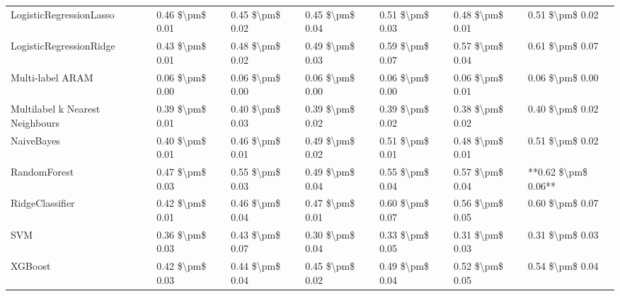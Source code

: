 \begin{tabular}{lllllll}
        LogisticRegressionLasso & 0.46 \$\textbackslash pm\$ 0.01 &           0.45 \$\textbackslash pm\$ 0.02 &       0.45 \$\textbackslash pm\$ 0.04 &        0.51 \$\textbackslash pm\$ 0.03 &                         0.48 \$\textbackslash pm\$ 0.01 &     0.51 \$\textbackslash pm\$ 0.02 \\
        LogisticRegressionRidge & 0.43 \$\textbackslash pm\$ 0.01 &           0.48 \$\textbackslash pm\$ 0.02 &       0.49 \$\textbackslash pm\$ 0.03 &        0.59 \$\textbackslash pm\$ 0.07 &                         0.57 \$\textbackslash pm\$ 0.04 &     0.61 \$\textbackslash pm\$ 0.07 \\
               Multi-label ARAM & 0.06 \$\textbackslash pm\$ 0.00 &           0.06 \$\textbackslash pm\$ 0.00 &       0.06 \$\textbackslash pm\$ 0.00 &        0.06 \$\textbackslash pm\$ 0.00 &                         0.06 \$\textbackslash pm\$ 0.01 &     0.06 \$\textbackslash pm\$ 0.00 \\
Multilabel k Nearest Neighbours & 0.39 \$\textbackslash pm\$ 0.01 &           0.40 \$\textbackslash pm\$ 0.03 &       0.39 \$\textbackslash pm\$ 0.02 &        0.39 \$\textbackslash pm\$ 0.02 &                         0.38 \$\textbackslash pm\$ 0.02 &     0.40 \$\textbackslash pm\$ 0.02 \\
                     NaiveBayes & 0.40 \$\textbackslash pm\$ 0.01 &           0.46 \$\textbackslash pm\$ 0.01 &       0.49 \$\textbackslash pm\$ 0.02 &        0.51 \$\textbackslash pm\$ 0.01 &                         0.48 \$\textbackslash pm\$ 0.01 &     0.51 \$\textbackslash pm\$ 0.02 \\
                   RandomForest & 0.47 \$\textbackslash pm\$ 0.03 &           0.55 \$\textbackslash pm\$ 0.03 &       0.49 \$\textbackslash pm\$ 0.04 &        0.55 \$\textbackslash pm\$ 0.04 &                         0.57 \$\textbackslash pm\$ 0.04 & **0.62 \$\textbackslash pm\$ 0.06** \\
                RidgeClassifier & 0.42 \$\textbackslash pm\$ 0.01 &           0.46 \$\textbackslash pm\$ 0.04 &       0.47 \$\textbackslash pm\$ 0.01 &        0.60 \$\textbackslash pm\$ 0.07 &                         0.56 \$\textbackslash pm\$ 0.05 &     0.60 \$\textbackslash pm\$ 0.07 \\
                            SVM & 0.36 \$\textbackslash pm\$ 0.03 &           0.43 \$\textbackslash pm\$ 0.07 &       0.30 \$\textbackslash pm\$ 0.04 &        0.33 \$\textbackslash pm\$ 0.05 &                         0.31 \$\textbackslash pm\$ 0.03 &     0.31 \$\textbackslash pm\$ 0.03 \\
                        XGBoost & 0.42 \$\textbackslash pm\$ 0.03 &           0.44 \$\textbackslash pm\$ 0.04 &       0.45 \$\textbackslash pm\$ 0.02 &        0.49 \$\textbackslash pm\$ 0.04 &                         0.52 \$\textbackslash pm\$ 0.05 &     0.54 \$\textbackslash pm\$ 0.04 \\
\bottomrule
\end{tabular}
